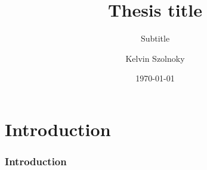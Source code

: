 \documentclass{beamer}
\title{Thesis title}
\subtitle{Subtitle}
\author{Kelvin Szolnoky}
\institute{Karolinska Institute, Department of Global Public Health}
\date{\today}
\begin{document}
\frame{\titlepage}

\section{Introduction}

\begin{frame}
    \frametitle{Introduction}
\end{frame}

\end{document}
